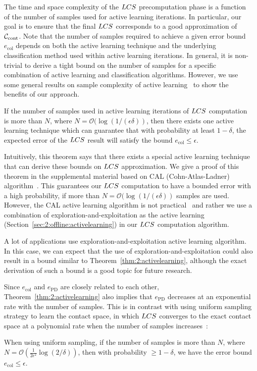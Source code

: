 The time and space complexity of the $LCS$ precomputation phase is a function of
the number of samples used for active learning iterations. In particular, our
goal is to ensure that the final $LCS$ corresponds to a good approximation of $\mathcal C_\text{cont}$. Note that the number of samples required to achieve a given error bound $e_{\text{col}}$ depends on both the active learning technique and the underlying classification method used within active learning iterations. In general, it is non-trivial to derive a tight bound on the number of samples for a specific combination of active learning and classification algorithms. However, we use some general results on sample complexity of active learning~\cite{Hanneke:2013} to show the benefits of our approach.
\begin{theorem}
\label{thm:2:activelearning}
If the number of samples used in active learning iterations of $LCS$ computation is more than $N$,
where $N=\mathcal O(\log(1/(\epsilon \delta))$, then there exists one active learning technique which can guarantee that with probability at least $1-\delta$, the expected error of the $LCS$ result will satisfy the bound $e_{\text{col}}\leq\epsilon$.
\end{theorem}

Intuitively, this theorem says that there exists a special active learning technique that can derive these bounds on $LCS$ approximation. We give a proof of this theorem in the supplemental material based on CAL (Cohn-Atlas-Ladner) algorithm~\cite{Cohn:ML:1994}. This guarantees our $LCS$ computation to have a bounded error with a high probability, if more than $N=\mathcal O(\log(1/(\epsilon \delta))$ samples are used. However, the CAL active learning algorithm is not practical~\cite{Hanneke:2013} and rather we use a combination of exploration-and-exploitation as the active learning (Section~\ref{sec:2:offline:activelearning}) in our $LCS$ computation algorithm.

A lot of applications use exploration-and-exploitation active learning algorithm. In this case, we can expect that the use of exploration-and-exploitation could also result in a bound similar to Theorem~\ref{thm:2:activelearning}, although the exact derivation of such a bound is a good topic for future research.

Since $e_{\text{col}}$ and $e_{\text{PD}}$ are closely related to each other, Theorem~\ref{thm:2:activelearning} also implies that
$e_{\text{PD}}$ decreases at an exponential rate with the number of samples.
This is in contrast with using uniform sampling strategy to
learn the contact space, in which $LCS$ converges to the
exact contact space
at a polynomial rate when the number of samples
increases~\cite{Mohri:2012:FML}:
\begin{theorem}
\label{thm:2:uniform}
When using uniform sampling, if the number of samples is more than $N$, where $N = \mathcal O(
\frac{1}{2\epsilon^2} \log(2/\delta))$, then
with probability $\geq 1- \delta$, we have the error bound $e_{\text{col}} \leq
\epsilon$.
\end{theorem}

